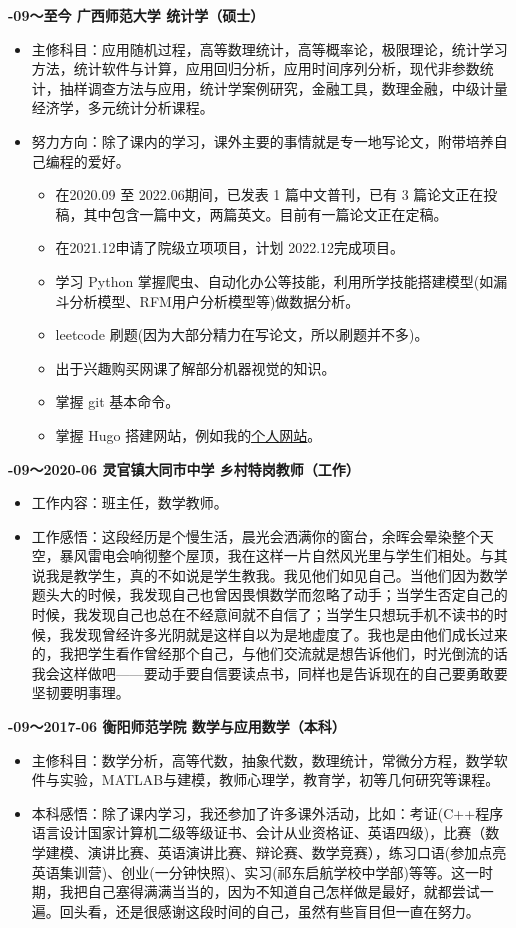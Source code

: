 \documentclass[UFT8]{ctexart}
\def\bi{\begin{itemize}}
\def\ei{\end{itemize}}
\begin{document}
{\center \bf {}-09～至今 \quad 广西师范大学 \quad  统计学（硕士）}
\smallskip

\bi
\item 主修科目：应用随机过程，高等数理统计，高等概率论，极限理论，统计学习方法，统计软件与计算，应用回归分析，应用时间序列分析，现代非参数统计，抽样调查方法与应用，统计学案例研究，金融工具，数理金融，中级计量经济学，多元统计分析课程。
\item 努力方向：除了课内的学习，课外主要的事情就是专一地写论文，附带培养自己编程的爱好。
\bi
\item 在2020.09 至 2022.06期间，已发表 1 篇中文普刊，已有 3 篇论文正在投稿，其中包含一篇中文，两篇英文。目前有一篇论文正在定稿。
\item 在2021.12申请了院级立项项目，计划 2022.12完成项目。 

\item 学习 Python 掌握爬虫、自动化办公等技能，利用所学技能搭建模型(如漏斗分析模型、RFM用户分析模型等)做数据分析。
\item leetcode 刷题(因为大部分精力在写论文，所以刷题并不多)。
\item  出于兴趣购买网课了解部分机器视觉的知识。
\item  掌握 git 基本命令。
 \item 掌握 Hugo 搭建网站，例如我的\href{https://tang-jay.github.io}{\uline{个人网站}}。
\ei
\ei

{\center \bf {}-09～2020-06 \quad  灵官镇大同市中学 \quad  乡村特岗教师（工作）}
\smallskip
 
\bi
\item 工作内容：班主任，数学教师。
\item 工作感悟：这段经历是个慢生活，晨光会洒满你的窗台，余晖会晕染整个天空，暴风雷电会响彻整个屋顶，我在这样一片自然风光里与学生们相处。与其说我是教学生，真的不如说是学生教我。我见他们如见自己。当他们因为数学题头大的时候，我发现自己也曾因畏惧数学而忽略了动手；当学生否定自己的时候，我发现自己也总在不经意间就不自信了；当学生只想玩手机不读书的时候，我发现曾经许多光阴就是这样自以为是地虚度了。我也是由他们成长过来的，我把学生看作曾经那个自己，与他们交流就是想告诉他们，时光倒流的话我会这样做吧——要动手要自信要读点书，同样也是告诉现在的自己要勇敢要坚韧要明事理。
\ei

{\center \bf {}-09～2017-06 \quad   衡阳师范学院  \quad 数学与应用数学（本科）}
\smallskip
  
\bi
\item 主修科目：数学分析，高等代数，抽象代数，数理统计，常微分方程，数学软件与实验，MATLAB与建模，教师心理学，教育学，初等几何研究等课程。
\item 本科感悟：除了课内学习，我还参加了许多课外活动，比如：考证(C++程序语言设计国家计算机二级等级证书、会计从业资格证、英语四级)，比赛（数学建模、演讲比赛、英语演讲比赛、辩论赛、数学竞赛），练习口语(参加点亮英语集训营)、创业(一分钟快照)、实习(祁东启航学校中学部)等等。这一时期，我把自己塞得满满当当的，因为不知道自己怎样做是最好，就都尝试一遍。回头看，还是很感谢这段时间的自己，虽然有些盲目但一直在努力。 
\ei
\end{document}
